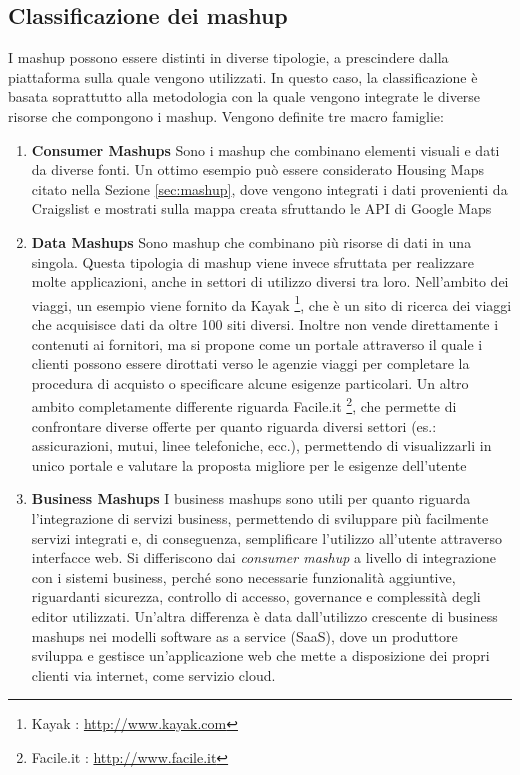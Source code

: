 \subsection{Classificazione dei mashup\label{sec:mashup-classification}}
I mashup possono essere distinti in diverse tipologie, a prescindere dalla piattaforma sulla quale vengono utilizzati.
In questo caso, la classificazione è basata soprattutto alla metodologia con la quale vengono integrate le diverse risorse che compongono i mashup. Vengono definite tre macro famiglie:
\begin{enumerate}
	\item \textbf{Consumer Mashups} Sono i mashup che combinano elementi visuali e dati da diverse fonti. Un ottimo esempio può essere considerato Housing Maps citato nella Sezione \ref{sec:mashup}, dove vengono integrati i dati provenienti da Craigslist e mostrati sulla mappa creata sfruttando le API di Google Maps
	\item \textbf{Data Mashups} Sono mashup che combinano più risorse di dati in una singola. Questa tipologia di mashup viene invece sfruttata per realizzare molte applicazioni, anche in settori di utilizzo diversi tra loro.
	Nell'ambito dei viaggi, un esempio viene fornito da Kayak \footnote{Kayak : \url{http://www.kayak.com}}, che è un sito di ricerca dei viaggi che acquisisce dati da oltre 100 siti diversi. Inoltre non vende direttamente i contenuti ai fornitori, ma si propone come un portale attraverso il quale i clienti possono essere dirottati verso le agenzie viaggi per completare la procedura di acquisto o specificare alcune esigenze particolari.
	Un altro ambito completamente differente riguarda Facile.it \footnote{Facile.it : \url{http://www.facile.it}}, che permette di confrontare diverse offerte per quanto riguarda diversi settori (es.: assicurazioni, mutui, linee telefoniche, ecc.), permettendo di visualizzarli in unico portale e valutare la proposta migliore per le esigenze dell'utente
	\item \textbf{Business Mashups} I business mashups sono utili per quanto riguarda l'integrazione di servizi business, permettendo di sviluppare più facilmente servizi integrati e, di conseguenza, semplificare l'utilizzo all'utente attraverso interfacce web. Si differiscono dai \emph{consumer mashup} a livello di integrazione con i sistemi business, perché sono necessarie funzionalità aggiuntive, riguardanti sicurezza, controllo di accesso, governance e complessità degli editor utilizzati. Un'altra differenza è data dall'utilizzo crescente di business mashups nei modelli software as a service (SaaS), dove un produttore sviluppa e gestisce un'applicazione web che mette a disposizione dei propri clienti via internet, come servizio cloud.
\end{enumerate}

